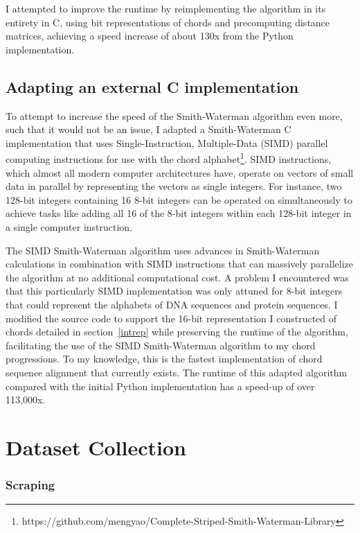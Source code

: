I attempted to improve the runtime by reimplementing the algorithm in its entirety in C, using bit representations of chords and precomputing distance matrices, achieving a speed increase of about 130x from the Python implementation.

\subsection{Adapting an external C implementation}

To attempt to increase the speed of the Smith-Waterman algorithm even more, such that it would not be an issue, I adapted a Smith-Waterman C implementation that uses Single-Instruction, Multiple-Data (SIMD) parallel computing instructions for use with the chord alphabet\cite{Zhao_2013}\footnote{https://github.com/mengyao/Complete-Striped-Smith-Waterman-Library}. SIMD instructions, which almost all modern computer architectures have, operate on vectors of small data in parallel by representing the vectors as single integers. For instance, two 128-bit integers containing 16 8-bit integers can be operated on simultaneously to achieve tasks like adding all 16 of the 8-bit integers within each 128-bit integer in a single computer instruction.

The SIMD Smith-Waterman algorithm uses advances in Smith-Waterman calculations\cite{chao1992aligning} in combination with SIMD instructions that can massively parallelize the algorithm at no additional computational cost. A problem I encountered was that this particularly SIMD implementation was only attuned for 8-bit integers that could represent the alphabets of DNA sequences and protein sequences. I modified the source code to support the 16-bit representation I constructed of chords detailed in section~\ref{intrep} while preserving the runtime of the algorithm, facilitating the use of the SIMD Smith-Waterman algorithm to my chord progressions. To my knowledge, this is the fastest implementation of chord sequence alignment that currently exists. The runtime of this adapted algorithm compared with the initial Python implementation has a speed-up of over 113,000x.

\section{Dataset Collection}

\subsubsection{Scraping}

